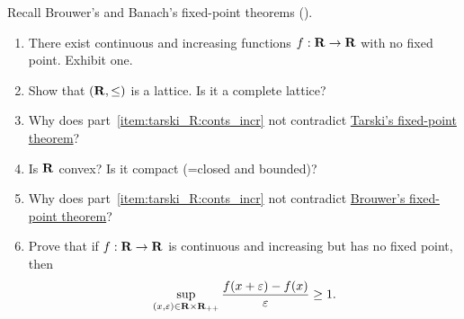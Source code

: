 \begin{exercise}
	\label{exercise:tarski_R}
	Recall Brouwer's and Banach's fixed-point theorems ().

	\begin{enumerate}[label=(\alph*)]

		\item \label{item:tarski_R:conts_incr} There exist continuous and increasing functions $f : \mathbf{R} \to \mathbf{R}$ with no fixed point. Exhibit one.

		\item Show that $(\mathbf{R},\mathord{\leq})$ is a lattice. Is it a complete lattice?

		\item Why does part~\ref{item:tarski_R:conts_incr} not contradict \hyperref[theorem:tarski]{Tarski's fixed-point theorem}?

		\item Is $\mathbf{R}$ convex? Is it compact (=closed and bounded)?

		\item Why does part~\ref{item:tarski_R:conts_incr} not contradict \hyperref[item:fpt_browuer]{Brouwer's fixed-point theorem}?

		\item Prove that if $f : \mathbf{R} \to \mathbf{R}$ is continuous and increasing but has no fixed point, then
		\begin{equation*}
			\sup_{(x,\varepsilon) \in \mathbf{R} \times \mathbf{R}_{++}} \frac{ f(x+\varepsilon) - f(x) }{ \varepsilon } \geq 1 .
		\end{equation*}
	
	\end{enumerate}
\end{exercise}

